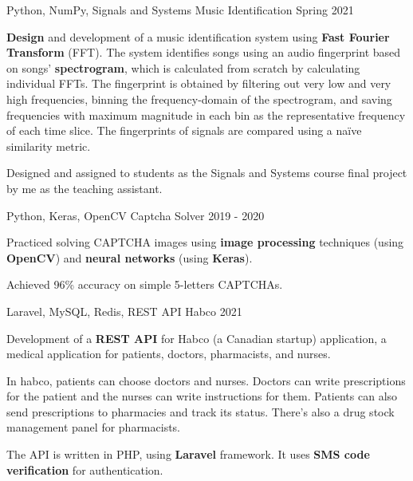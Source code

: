\begin{cventries}
  \cventry
    {Python, NumPy, Signals and Systems} %
    {Music Identification} %
    {} %
    {Spring 2021} %
    {
      \begin{cvitems} %
      	\item {\textbf{Design} and development of a music identification system using \textbf{Fast Fourier Transform} (FFT). The system identifies songs using an audio fingerprint based on songs' \textbf{spectrogram}, which is calculated from scratch by calculating individual FFTs. The fingerprint is obtained by filtering out very low and very high frequencies, binning the frequency-domain of the spectrogram, and saving frequencies with maximum magnitude in each bin as the representative frequency of each time slice. The fingerprints of signals are compared using a naïve similarity metric.}
        \item {Designed and assigned to students as the Signals and Systems course final project by me as the teaching assistant.}
      \end{cvitems}
    }

  \cventry
    {Python, Keras, OpenCV} %
    {Captcha Solver} %
    {} %
    {2019 - 2020} %
    {
      \begin{cvitems} %
      	\item {Practiced solving CAPTCHA images using \textbf{image processing} techniques (using \textbf{OpenCV}) and \textbf{neural networks} (using \textbf{Keras}).}
      	\item {Achieved 96\% accuracy on simple 5-letters CAPTCHAs.}
      \end{cvitems}
    }
    
  \cventry
    {Laravel, MySQL, Redis, REST API} %
    {Habco} %
    {} %
    {2021} %
    {
      \begin{cvitems} %
      	\item {Development of a \textbf{REST API} for Habco (a Canadian startup) application, a medical application for patients, doctors, pharmacists, and nurses.}
      	\item {In habco, patients can choose doctors and nurses. Doctors can write prescriptions for the patient and the nurses can write instructions for them. Patients can also send prescriptions to pharmacies and track its status. There's also a drug stock management panel for pharmacists.}
      	\item {The API is written in PHP, using \textbf{Laravel} framework. It uses \textbf{SMS code verification} for authentication.}
      \end{cvitems}
    }


\end{cventries}
